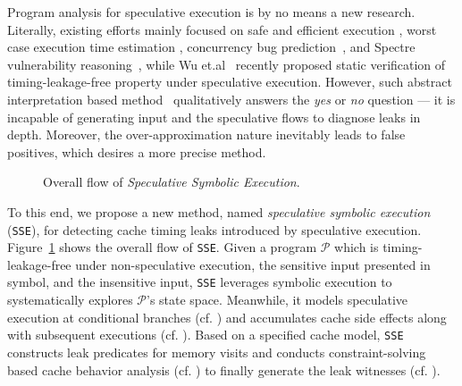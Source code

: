 \documentclass[sigconf]{acmart}
\newcommand\ignore[1]{}
\newcommand*\circled[1]{\tikz[baseline=(char.base)]{
				\node[shape=circle,draw,inner sep=1pt] (char) {\scriptsize{#1}};}}
\newcommand{\prog}{\mathcal{P}}
\begin{document}
Program analysis for speculative execution is by no means a new research. Literally, 
existing efforts mainly focused on safe and efficient execution
\cite{ChenLDHY04,PrabhuRV10,GuarnieriKMRS19}, worst case execution time estimation
\cite{LiMR03,LiMR05}, concurrency bug prediction~\cite{ChenWYS09,LiELS05}, and Spectre
vulnerability reasoning~\cite{GuarnieriKMRS19,OleksenkoTSF19,WangCBMR19}, while
Wu et.al~\cite{WuW19} recently proposed static verification of timing-leakage-free 
property under speculative execution. However, such abstract interpretation based 
method~\cite{WuW19} qualitatively answers the \textit{yes} or \textit{no} question 
--- it is incapable of generating input and the speculative flows to diagnose leaks 
in depth. Moreover, the over-approximation nature inevitably leads to false positives, 
which desires a more precise method.


\begin{figure}
  \centering
  \scalebox{1.0}{}
  \caption{Overall flow of \emph{Speculative Symbolic Execution}.}
  \label{fig:overall_flow}
\end{figure}


To this end, we propose a new method, named \textit{speculative symbolic execution}
(\texttt{SSE}), for detecting cache timing leaks introduced by speculative execution. 
Figure~\ref{fig:overall_flow} shows the overall flow of \texttt{SSE}. Given a program 
$\prog$ which is timing-leakage-free under non-speculative execution, the sensitive 
input presented in symbol, and the insensitive input, \texttt{SSE} leverages symbolic 
execution to systematically explores $\prog$'s state space. Meanwhile, it models 
speculative execution at conditional branches (cf. \circled{1}) and accumulates cache 
side effects along with subsequent executions (cf. \circled{2}). Based on a specified 
cache model, \texttt{SSE} constructs leak predicates for memory visits and conducts 
constraint-solving based cache behavior analysis (cf. \circled{3}) to finally generate 
the leak witnesses (cf. \circled{4}). 


\ignore{
To be specific, the symbolic input reflects the leaks that 
are relevant to secret, the speculative execution modeling supplies behavioral 
simulation on program paths, the cache modeling forms leak exposure constraints 
while the the cache analysis discloses divergent cache behaviors at an identified 
execution flow. 
}
\end{document}

